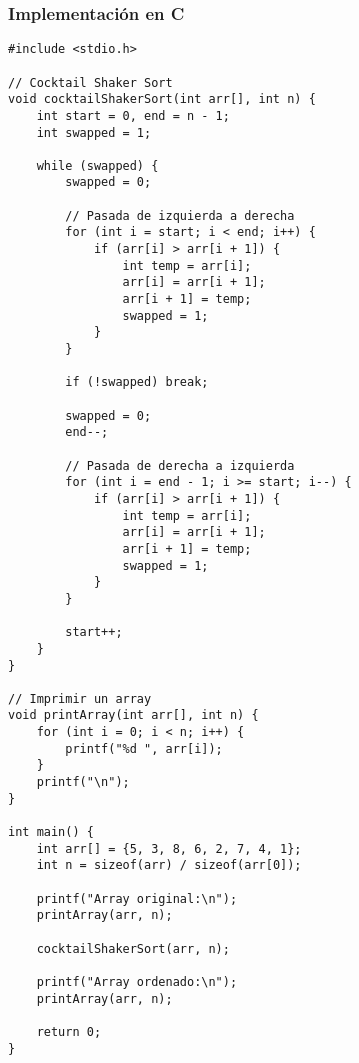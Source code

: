\documentclass[11pt,openany]{book}
\begin{document}
\subsubsection{Implementación en C}
\lstset{language=C}
\begin{lstlisting}
#include <stdio.h>

// Cocktail Shaker Sort
void cocktailShakerSort(int arr[], int n) {
    int start = 0, end = n - 1;
    int swapped = 1;

    while (swapped) {
        swapped = 0;

        // Pasada de izquierda a derecha
        for (int i = start; i < end; i++) {
            if (arr[i] > arr[i + 1]) {
                int temp = arr[i];
                arr[i] = arr[i + 1];
                arr[i + 1] = temp;
                swapped = 1;
            }
        }

        if (!swapped) break;

        swapped = 0;
        end--;

        // Pasada de derecha a izquierda
        for (int i = end - 1; i >= start; i--) {
            if (arr[i] > arr[i + 1]) {
                int temp = arr[i];
                arr[i] = arr[i + 1];
                arr[i + 1] = temp;
                swapped = 1;
            }
        }

        start++;
    }
}

// Imprimir un array
void printArray(int arr[], int n) {
    for (int i = 0; i < n; i++) {
        printf("%d ", arr[i]);
    }
    printf("\n");
}

int main() {
    int arr[] = {5, 3, 8, 6, 2, 7, 4, 1};
    int n = sizeof(arr) / sizeof(arr[0]);

    printf("Array original:\n");
    printArray(arr, n);

    cocktailShakerSort(arr, n);

    printf("Array ordenado:\n");
    printArray(arr, n);

    return 0;
}
\end{lstlisting}
\end{document}
